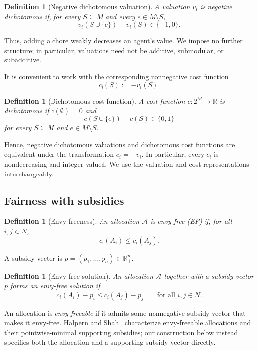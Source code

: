 \documentclass[sigconf,anonymous]{aamas}
\newcommand{\agents}{N}
\newcommand{\items}{M}
\newcommand{\alloc}{\mathcal{A}}
\newcommand{\bundle}[1]{A_{#1}}
\newcommand{\subsidy}{p}
\newcommand{\cost}{c}
\newcommand{\R}{\mathbb{R}}
\theoremstyle{acmplain}
\theoremstyle{acmdefinition}
\newtheorem{definition}[theorem]{Definition}
\theoremstyle{acmplain}
\begin{document}
\begin{definition}[Negative dichotomous valuation]
\label{def:negdich}
A valuation $v_i$ is \emph{negative dichotomous} if, for every
$S\subseteq\items$ and every $e\in\items\setminus S$,
\[
v_i(S\cup\{e\})-v_i(S)\in\{-1,0\}.
\]
\end{definition}

Thus, adding a chore weakly decreases an agent's value. We impose
no further structure; in particular, valuations need not be
additive, submodular, or subadditive.

It is convenient to work with the corresponding nonnegative cost
function
\[
\cost_i(S):=-v_i(S).
\]

\begin{definition}[Dichotomous cost function]
\label{def:dichcost}
A cost function $\cost:2^{\items}\to\R$ is \emph{dichotomous} if
$\cost(\emptyset)=0$ and
\[
\cost(S\cup\{e\})-\cost(S)\in\{0,1\}
\]
for every $S\subseteq\items$ and $e\in\items\setminus S$.
\end{definition}

Hence, negative dichotomous valuations and dichotomous cost
functions are equivalent under the transformation
$\cost_i=-v_i$. In particular, every $\cost_i$ is nondecreasing and
integer-valued. We use the valuation and cost representations
interchangeably.

\subsection{Fairness with subsidies}

\begin{definition}[Envy-freeness]
\label{def:ef}
An allocation $\alloc$ is \emph{envy-free} (EF) if, for all
$i,j\in\agents$,
\[
\cost_i(\bundle{i})\le \cost_i(\bundle{j}).
\]
\end{definition}

A subsidy vector is $\subsidy=(\subsidy_1,\ldots,\subsidy_n)\in
\R_+^n$.

\begin{definition}[Envy-free solution]
\label{def:efsolution}
An allocation $\alloc$ together with a subsidy vector $\subsidy$
forms an \emph{envy-free solution} if
\[
\cost_i(\bundle{i})-\subsidy_i
\le
\cost_i(\bundle{j})-\subsidy_j
\qquad\text{for all }i,j\in\agents.
\]
\end{definition}

An allocation is \emph{envy-freeable} if it admits some
nonnegative subsidy vector that makes it envy-free. Halpern and
Shah~\cite{HS19} characterize envy-freeable allocations and their
pointwise-minimal supporting subsidies; our construction below
instead specifies both the allocation and a supporting subsidy
vector directly.
\end{document}
